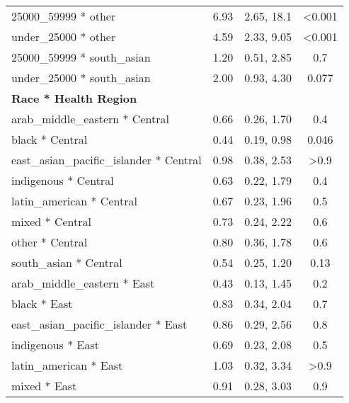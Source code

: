 \documentclass[
  letterpaper,
  DIV=11,
  numbers=noendperiod]{scrartcl}
\begin{document}
\begin{longtable}{lccc}
\hspace{1em}25000\_59999 * other & 6.93 & 2.65, 18.1 & <0.001\\
\hspace{1em}under\_25000 * other & 4.59 & 2.33, 9.05 & <0.001\\
\hspace{1em}25000\_59999 * south\_asian & 1.20 & 0.51, 2.85 & 0.7\\
\hspace{1em}under\_25000 * south\_asian & 2.00 & 0.93, 4.30 & 0.077\\
\textbf{Race * Health Region} &  &  & \\
\hspace{1em}arab\_middle\_eastern * Central & 0.66 & 0.26, 1.70 & 0.4\\
\hspace{1em}black * Central & 0.44 & 0.19, 0.98 & 0.046\\
\hspace{1em}east\_asian\_pacific\_islander * Central & 0.98 & 0.38, 2.53 & >0.9\\
\hspace{1em}indigenous * Central & 0.63 & 0.22, 1.79 & 0.4\\
\hspace{1em}latin\_american * Central & 0.67 & 0.23, 1.96 & 0.5\\
\hspace{1em}mixed * Central & 0.73 & 0.24, 2.22 & 0.6\\
\hspace{1em}other * Central & 0.80 & 0.36, 1.78 & 0.6\\
\hspace{1em}south\_asian * Central & 0.54 & 0.25, 1.20 & 0.13\\
\hspace{1em}arab\_middle\_eastern * East & 0.43 & 0.13, 1.45 & 0.2\\
\hspace{1em}black * East & 0.83 & 0.34, 2.04 & 0.7\\
\hspace{1em}east\_asian\_pacific\_islander * East & 0.86 & 0.29, 2.56 & 0.8\\
\hspace{1em}indigenous * East & 0.69 & 0.23, 2.08 & 0.5\\
\hspace{1em}latin\_american * East & 1.03 & 0.32, 3.34 & >0.9\\
\hspace{1em}mixed * East & 0.91 & 0.28, 3.03 & 0.9\\

\end{longtable}
\end{document}
